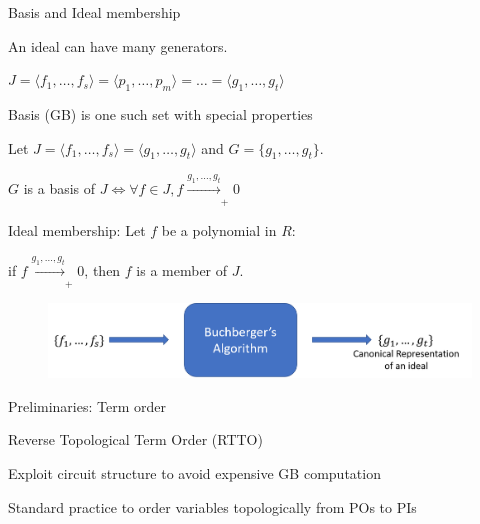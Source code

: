 \begin{frame}{\large \Grobner Basis and Ideal membership}
\bi
	\item An ideal can have many generators. 
	\vspace{0.1in}
	\bi
		\item $J = \langle f_1,\dots,f_s\rangle = \langle p_1,\dots,p_m\rangle = \dots = \langle g_1,\dots,g_t\rangle$
		\vspace{0.1in}
		\item \Grobner Basis (GB) is one such set with special properties
	\ei
	\pause
	\vspace{0.1in}
	\vspace{0.1in}
	\item Let $J =  \langle f_1,\dots,f_s\rangle = \langle g_1,\dots,g_t\rangle$
	and $G = \{g_1,\dots,g_t \}$.
	\bi
	\item $G$ is a \Grobner basis of $J \iff \forall f \in J, f \xrightarrow[]{g_1,\dots,g_t}_+ 0$ 
	\vspace{0.1in}
	\item Ideal membership: Let $f$ be a polynomial in $R$:
	\bi
		\item if $f \xrightarrow[]{g_1,\dots,g_t}_+ 0$, then $f$ is a member of $J$. 
	\ei
	\ei
\ei
\vspace{0.1in}
\pause
\begin{figure}
\centering
\includegraphics[scale=0.39]{GB.png}
\end{figure}
\end{frame}

\begin{frame}{\large Preliminaries: Term order}
\bi
	\item Reverse Topological Term Order (RTTO)
	\bi
		\item Exploit circuit structure to avoid expensive GB computation
		\item Standard practice to order variables topologically from POs to PIs
	\ei
\ei
\end{frame}

